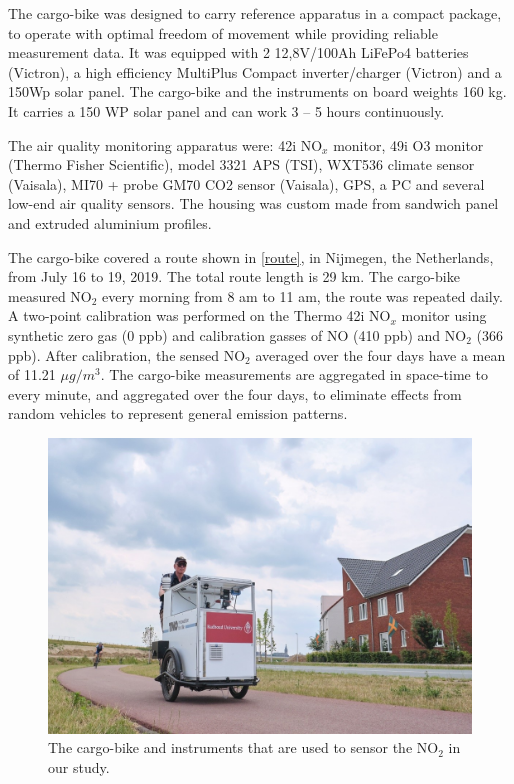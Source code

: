 \documentclass{article}
\begin{document}
The cargo-bike was designed to carry reference apparatus in a compact package, to operate with optimal freedom of movement while providing reliable measurement data. It was equipped with 2 12,8V/100Ah LiFePo4 batteries (Victron), a high efficiency MultiPlus Compact inverter/charger (Victron) and a 150Wp solar panel. The cargo-bike and the instruments on board weights 160 kg. It carries a 150 WP solar panel and can work 3 – 5 hours continuously.   

The air quality monitoring apparatus were: 42i NO$_x$ monitor, 49i O3 monitor (Thermo Fisher Scientific), model 3321 APS (TSI), WXT536 climate sensor (Vaisala), MI70 + probe GM70 CO2 sensor (Vaisala), GPS, a PC and several low-end air quality sensors. The housing was custom made from sandwich panel and extruded aluminium profiles. 

The cargo-bike covered a route shown in \cref{route}, in Nijmegen, the Netherlands, from July 16 to 19, 2019. The total route length is 29 km. The cargo-bike measured NO$_2$ every morning from 8 am to 11 am, the route was repeated daily. A two-point calibration was performed on the Thermo 42i NO$_x$ monitor using synthetic zero gas (0 ppb) and calibration gasses of NO (410 ppb) and NO$_2$ (366 ppb). After calibration, the sensed NO$_2$ averaged over the four days have a mean of 11.21 $\mu g/m^3$. The cargo-bike measurements are aggregated in space-time to every minute, and aggregated over the four days, to eliminate effects from random vehicles to represent general emission patterns.    



\begin{figure}[H]
    \includegraphics[scale = 0.8,trim=1cm 0cm 3cm 2cm, clip=true]{f1a.jpg}
    
    \caption {The cargo-bike and instruments that are used to sensor the NO$_2$ in our study.}
    \label{bike}
\end{figure}
\end{document}
